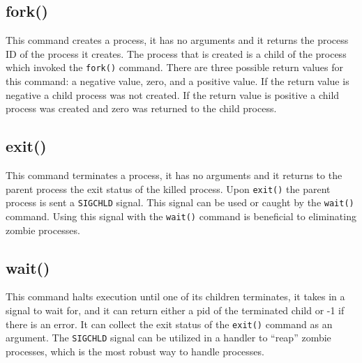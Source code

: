     \subsection{fork()}\label{subsec:fork}
        This command creates a process, it has no arguments and it returns the process ID of the process it creates.
        The process that is created is a child of the process which invoked the \texttt{fork()} command.
        There are three possible return values for this command: a negative value, zero, and a positive value.
        If the return value is negative a child process was not created.
        If the return value is positive a child process was created and zero was returned to the child process.

    \subsection{exit()}\label{subsec:exit}
        This command terminates a process, it has no arguments and it returns to the parent process the exit status of the killed process.
        Upon \texttt{exit()} the parent process is sent a \texttt{SIGCHLD} signal.
        This signal can be used or caught by the \texttt{wait()} command.
        Using this signal with the \texttt{wait()} command is beneficial to eliminating zombie processes.

    \subsection{wait()}\label{subsec:wait}
        This command halts execution until one of its children terminates, it takes in a signal to wait for, and it can return either a pid of the terminated child or -1 if there is an error.
        It can collect the exit status of the \texttt{exit()} command as an argument.
        The \texttt{SIGCHLD} signal can be utilized in a handler to “reap” zombie processes, which is the most robust way to handle processes.

